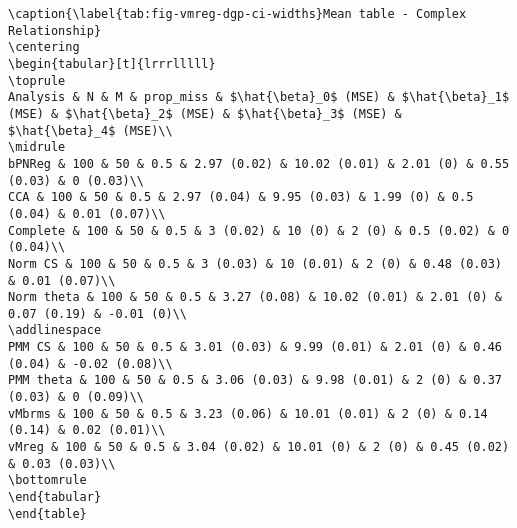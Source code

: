 \documentclass[
]{article}
\begin{document}
\begin{verbatim}
\caption{\label{tab:fig-vmreg-dgp-ci-widths}Mean table - Complex Relationship}
\centering
\begin{tabular}[t]{lrrrlllll}
\toprule
Analysis & N & M & prop_miss & $\hat{\beta}_0$ (MSE) & $\hat{\beta}_1$ (MSE) & $\hat{\beta}_2$ (MSE) & $\hat{\beta}_3$ (MSE) & $\hat{\beta}_4$ (MSE)\\
\midrule
bPNReg & 100 & 50 & 0.5 & 2.97 (0.02) & 10.02 (0.01) & 2.01 (0) & 0.55 (0.03) & 0 (0.03)\\
CCA & 100 & 50 & 0.5 & 2.97 (0.04) & 9.95 (0.03) & 1.99 (0) & 0.5 (0.04) & 0.01 (0.07)\\
Complete & 100 & 50 & 0.5 & 3 (0.02) & 10 (0) & 2 (0) & 0.5 (0.02) & 0 (0.04)\\
Norm CS & 100 & 50 & 0.5 & 3 (0.03) & 10 (0.01) & 2 (0) & 0.48 (0.03) & 0.01 (0.07)\\
Norm theta & 100 & 50 & 0.5 & 3.27 (0.08) & 10.02 (0.01) & 2.01 (0) & 0.07 (0.19) & -0.01 (0)\\
\addlinespace
PMM CS & 100 & 50 & 0.5 & 3.01 (0.03) & 9.99 (0.01) & 2.01 (0) & 0.46 (0.04) & -0.02 (0.08)\\
PMM theta & 100 & 50 & 0.5 & 3.06 (0.03) & 9.98 (0.01) & 2 (0) & 0.37 (0.03) & 0 (0.09)\\
vMbrms & 100 & 50 & 0.5 & 3.23 (0.06) & 10.01 (0.01) & 2 (0) & 0.14 (0.14) & 0.02 (0.01)\\
vMreg & 100 & 50 & 0.5 & 3.04 (0.02) & 10.01 (0) & 2 (0) & 0.45 (0.02) & 0.03 (0.03)\\
\bottomrule
\end{tabular}
\end{table}
\end{verbatim}
\end{document}
